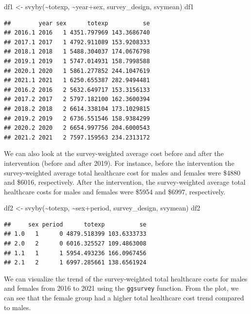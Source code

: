 \documentclass[
]{book}
\newenvironment{Shaded}{\begin{snugshade}}{\end{snugshade}}
\newcommand{\FunctionTok}[1]{\textcolor[rgb]{0.00,0.00,0.00}{#1}}
\newcommand{\NormalTok}[1]{#1}
\newcommand{\OtherTok}[1]{\textcolor[rgb]{0.56,0.35,0.01}{#1}}
\newcommand{\SpecialCharTok}[1]{\textcolor[rgb]{0.00,0.00,0.00}{#1}}
\begin{document}
\begin{Shaded}
\begin{Highlighting}[]
\NormalTok{df1 }\OtherTok{\textless{}{-}} \FunctionTok{svyby}\NormalTok{(}\SpecialCharTok{\textasciitilde{}}\NormalTok{totexp, }\SpecialCharTok{\textasciitilde{}}\NormalTok{year}\SpecialCharTok{+}\NormalTok{sex, survey\_design, svymean)}
\NormalTok{df1}
\end{Highlighting}
\end{Shaded}

\begin{verbatim}
##        year sex      totexp          se
## 2016.1 2016   1 4351.797969 143.3686740
## 2017.1 2017   1 4792.911089 153.9208333
## 2018.1 2018   1 5488.304037 174.0676798
## 2019.1 2019   1 5747.014931 158.7998588
## 2020.1 2020   1 5861.277852 244.1047619
## 2021.1 2021   1 6250.655387 282.9494481
## 2016.2 2016   2 5632.649717 153.3156133
## 2017.2 2017   2 5797.182100 162.3600394
## 2018.2 2018   2 6614.338104 173.1029815
## 2019.2 2019   2 6736.551546 158.9384299
## 2020.2 2020   2 6654.997756 204.6000543
## 2021.2 2021   2 7597.159563 234.2313172
\end{verbatim}

We can also look at the survey-weighted average cost before and after the intervention (before and after 2019). For instance, before the intervention the survey-weighted average total healthcare cost for males and females were \$4880 and \$6016, respectively. After the intervention, the survey-weighted average total healthcare costs for males and females were \$5954 and \$6997, respectively.

\begin{Shaded}
\begin{Highlighting}[]
\NormalTok{df2 }\OtherTok{\textless{}{-}} \FunctionTok{svyby}\NormalTok{(}\SpecialCharTok{\textasciitilde{}}\NormalTok{totexp, }\SpecialCharTok{\textasciitilde{}}\NormalTok{sex}\SpecialCharTok{+}\NormalTok{period, survey\_design, svymean)}
\NormalTok{df2}
\end{Highlighting}
\end{Shaded}

\begin{verbatim}
##     sex period      totexp          se
## 1.0   1      0 4879.518399 103.6333733
## 2.0   2      0 6016.325527 109.4863008
## 1.1   1      1 5954.493236 166.0967456
## 2.1   2      1 6997.285661 138.6561924
\end{verbatim}

We can visualize the trend of the survey-weighted total healthcare costs for males and females from 2016 to 2021 using the \texttt{ggsurvey} function. From the plot, we can see that the female group had a higher total healthcare cost trend compared to males.
\end{document}
